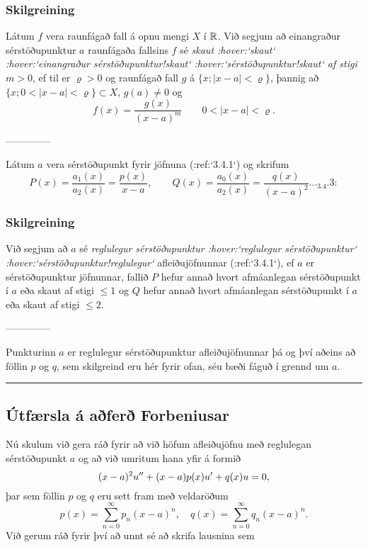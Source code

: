 \subsubsection{Skilgreining}
Látum $f$ vera raunfágað fall á opnu mengi  $X$ í ${\mathbb R}$.
Við segjum að einangraður
sérstöðupunktur $a$ raunfágaða fallsins $f$ sé 
{\it skaut :hover:`skaut` :hover:`einangraður sérstöðupunktur!skaut`
 :hover:`sérstöðupunktur!skaut` af
stigi $m>0$}, ef til er $\varrho>0$ og raunfágað fall $g$ á
$\{x; |x-a|<\varrho\}$, þannig að
$\{x; 0<|x-a|<{\varrho}\}\subset X$,  $g(a)\neq 0$ og
$$ f(x)=\dfrac {g(x)}{(x-a)^m}\qquad 0<|x-a|<\varrho. $$


--------------




Látum $a$ vera sérstöðupunkt fyrir jöfnuna (:ref:`3.4.1`)
og skrifum 
 \begin{equation*}P(x)=\dfrac{a_1(x)}{a_2(x)}=\dfrac{p(x)}{x-a}, \qquad
Q(x)=\dfrac{a_0(x)}{a_2(x)}=\dfrac{q(x)}{(x-a)^2}.

.. _3.4.3:

 \end{equation*}

\subsubsection{Skilgreining}
Við segjum að $a$ sé {\it reglulegur sérstöðupunktur :hover:`reglulegur
sérstöðupunktur` :hover:`sérstöðupunktur!reglulegur`} 
afleiðujöfnunnar (:ref:`3.4.1`), ef $a$ er sérstöðupunktur jöfnunnar,
fallið $P$ hefur annað hvort afmáanlegan sérstöðupunkt í $a$ eða skaut
af stigi $\leq 1$ og $Q$ hefur annað hvort afmáanlegan sérstöðupunkt
í $a$ eða skaut af stigi $\leq 2$. 


--------------



Punkturinn $a$ er reglulegur sérstöðupunktur afleiðujöfnunnar þá og
því aðeins að föllin $p$ og $q$, sem skilgreind eru hér fyrir ofan, 
séu bæði fáguð í grennd um $a$.

\bigskip\hrule\bigskip

\subsection*{Útfærsla á aðferð Forbeniusar}

Nú skulum við gera ráð fyrir að við höfum afleiðujöfnu með reglulegan
sérstöðupunkt $a$ og að við umritum hana yfir á formið
 $$(x-a)^2u{\sp{\prime\prime}}+(x-a)p(x)u{\sp{\prime}}+q(x)u=0,
 $$
þar sem föllin $p$ og $q$ eru sett fram með veldaröðum
 $$p(x)= \sum_{n=0}^\infty p_n(x-a)^n, \quad
q(x)= \sum_{n=0}^\infty q_n(x-a)^n.
 $$
Við  gerum ráð fyrir því að unnt sé að skrifa lausnina sem 

